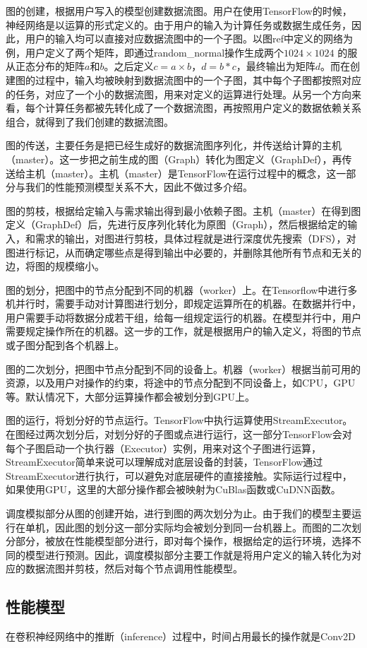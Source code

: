     图的创建，根据用户写入的模型创建数据流图。用户在使用TensorFlow的时候，神经网络是以运算的形式定义的。由于用户的输入为计算任务或数据生成任务，因此，用户的输入均可以直接对应数据流图中的一个子图。以图ref中定义的网络为例，用户定义了两个矩阵，即通过random\_normal操作生成两个$ 1024 \times 1024 $ 的服从正态分布的矩阵$ a $和$ b $。之后定义$ c = a \times b $，$ d = b * c $，最终输出为矩阵$ d $。而在创建图的过程中，输入均被映射到数据流图中的一个子图，其中每个子图都按照对应的任务，对应了一个小的数据流图，用来对定义的运算进行处理。从另一个方向来看，每个计算任务都被先转化成了一个数据流图，再按照用户定义的数据依赖关系组合，就得到了我们创建的数据流图。
    
    图的传送，主要任务是把已经生成好的数据流图序列化，并传送给计算的主机（master）。这一步把之前生成的图（Graph）转化为图定义（GraphDef），再传送给主机（master）。主机（master）是TensorFlow在运行过程中的概念，这一部分与我们的性能预测模型关系不大，因此不做过多介绍。
    
    图的剪枝，根据给定输入与需求输出得到最小依赖子图。主机（master）在得到图定义（GraphDef）后，先进行反序列化转化为原图（Graph），然后根据给定的输入，和需求的输出，对图进行剪枝，具体过程就是进行深度优先搜索（DFS），对图进行标记，从而确定哪些点是得到输出中必要的，并删除其他所有节点和无关的边，将图的规模缩小。
    
    图的划分，把图中的节点分配到不同的机器（worker）上。在Tensorflow中进行多机并行时，需要手动对计算图进行划分，即规定运算所在的机器。在数据并行中，用户需要手动将数据分成若干组，给每一组规定运行的机器。在模型并行中，用户需要规定操作所在的机器。这一步的工作，就是根据用户的输入定义，将图的节点或子图分配到各个机器上。
    
    图的二次划分，把图中节点分配到不同的设备上。机器（worker）根据当前可用的资源，以及用户对操作的约束，将途中的节点分配到不同设备上，如CPU，GPU等。默认情况下，大部分运算操作都会被划分到GPU上。
    
    图的运行，将划分好的节点运行。TensorFlow中执行运算使用StreamExecutor。在图经过两次划分后，对划分好的子图或点进行运行，这一部分TensorFlow会对每个子图启动一个执行器（Executor）实例，用来对这个子图进行运算，StreamExecutor简单来说可以理解成对底层设备的封装，TensorFlow通过StreamExecutor进行执行，可以避免对底层硬件的直接接触。实际运行过程中，如果使用GPU，这里的大部分操作都会被映射为CuBlas函数或CuDNN\cite{cudnn}函数。
    
    调度模拟部分从图的创建开始，进行到图的两次划分为止。由于我们的模型主要运行在单机，因此图的划分这一部分实际均会被划分到同一台机器上。而图的二次划分部分，被放在性能模型部分进行，即对每个操作，根据给定的运行环境，选择不同的模型进行预测。因此，调度模拟部分主要工作就是将用户定义的输入转化为对应的数据流图并剪枝，然后对每个节点调用性能模型。

\subsection{性能模型}
    在卷积神经网络中的推断（inference）过程中，时间占用最长的操作就是Conv2D
